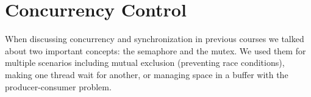 




\section*{Concurrency Control}

When discussing concurrency and synchronization in previous courses we talked about two important concepts: the semaphore and the mutex. We used them for multiple scenarios including mutual exclusion (preventing race conditions), making one thread wait for another, or managing space in a buffer with the producer-consumer problem.








